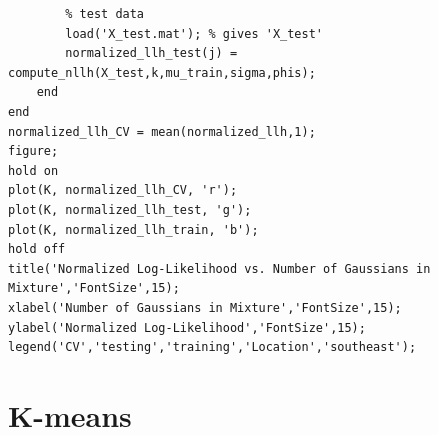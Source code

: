 \documentclass[english]{article}
\begin{document}
\begin{enumerate}
\begin{verbatim}
        % test data
        load('X_test.mat'); % gives 'X_test'
        normalized_llh_test(j) = compute_nllh(X_test,k,mu_train,sigma,phis);
    end
end
normalized_llh_CV = mean(normalized_llh,1);
figure;
hold on
plot(K, normalized_llh_CV, 'r');
plot(K, normalized_llh_test, 'g');
plot(K, normalized_llh_train, 'b');
hold off
title('Normalized Log-Likelihood vs. Number of Gaussians in Mixture','FontSize',15);
xlabel('Number of Gaussians in Mixture','FontSize',15);
ylabel('Normalized Log-Likelihood','FontSize',15);
legend('CV','testing','training','Location','southeast');
    \end{verbatim}
    
\end{enumerate}

\newpage

\section{K-means}
\end{document}
